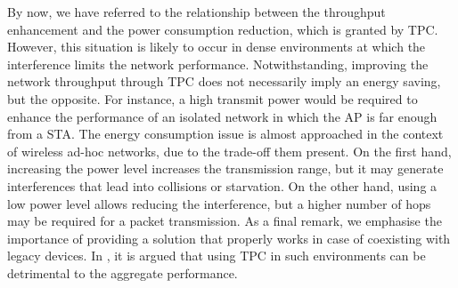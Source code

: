 \documentclass[12pt, a4paper,twoside]{tesi_upf}
\begin{document}
				By now, we have referred to the relationship between the throughput enhancement and the power consumption reduction, which is granted by TPC. However, this situation is likely to occur in dense environments at which the interference limits the network performance. Notwithstanding, improving the network throughput through TPC does not necessarily imply an energy saving, but the opposite. For instance, a high transmit power would be required to enhance the performance of an isolated network in which the AP is far enough from a STA. The energy consumption issue is almost approached in the context of wireless ad-hoc networks, due to the trade-off them present. On the first hand, increasing the power level increases the transmission range, but it may generate interferences that lead into collisions or starvation. On the other hand, using a low power level allows reducing the interference, but a higher number of hops may be required for a packet transmission. As a final remark, we emphasise the importance of providing a solution that properly works in case of coexisting with legacy devices. In \cite{broustis2010measurement}, it is argued that using TPC in such environments can be detrimental to the aggregate performance. 
				
\end{document}
